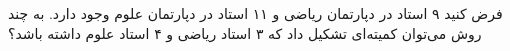 فرض کنید ۹ استاد در دپارتمان ریاضی و ۱۱ استاد در دپارتمان علوم وجود دارد. به چند روش می‌توان کمیته‌ای تشکیل داد که ۳ استاد ریاضی و ۴ استاد علوم داشته باشد؟